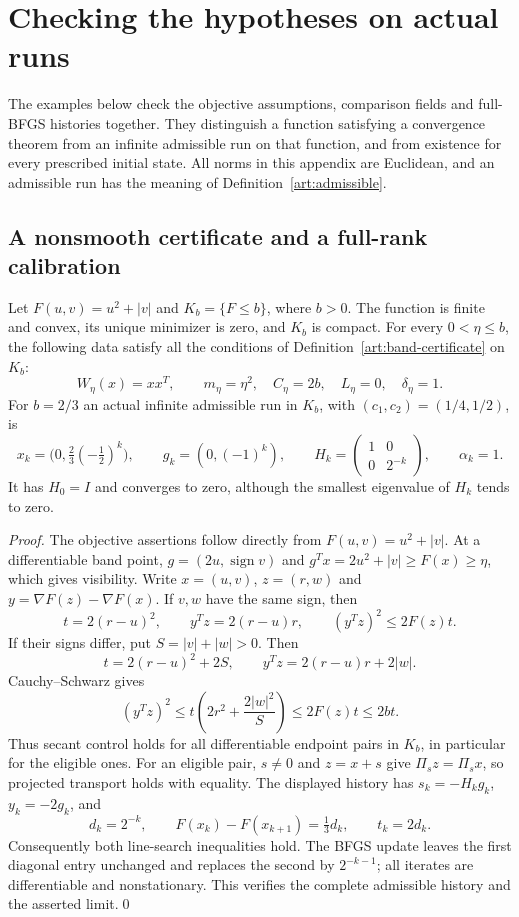 \section{Checking the hypotheses on actual runs}\label{art:hypothesis-examples}

The examples below check the objective assumptions, comparison fields and
full-BFGS histories together. They distinguish a function satisfying a
convergence theorem from an infinite admissible run on that function, and
from existence for every prescribed initial state. All norms in this appendix
are Euclidean, and an admissible run has the meaning of
Definition~\ref{art:admissible}.

\subsection{A nonsmooth certificate and a full-rank calibration}

\begin{proposition}\label{art:examples-mixed}
Let $F(u,v)=u^2+|v|$ and $K_b=\{F\le b\}$, where $b>0$.
The function is finite and convex, its unique minimizer is zero, and $K_b$
is compact. For every $0<\eta\le b$, the following data satisfy all the
conditions of Definition~\ref{art:band-certificate} on $K_b$:
\[
 W_\eta(x)=xx^T,\qquad m_\eta=\eta^2,\quad C_\eta=2b,
 \quad L_\eta=0,\quad\delta_\eta=1.
\]
For $b=2/3$ an actual infinite admissible run in $K_b$, with
$(c_1,c_2)=(1/4,1/2)$, is
\[
 x_k=\bigl(0,\tfrac23(-\tfrac12)^k\bigr),\qquad
 g_k=(0,(-1)^k),\qquad
 H_k=\begin{pmatrix}1&0\\0&2^{-k}\end{pmatrix},\qquad \alpha_k=1.
\]
It has $H_0=I$ and converges to zero, although the smallest eigenvalue of
$H_k$ tends to zero.
\end{proposition}
\begin{proof}
The objective assertions follow directly from $F(u,v)=u^2+|v|$.
At a differentiable band point, $g=(2u,\operatorname{sign}v)$ and
$g^Tx=2u^2+|v|\ge F(x)\ge\eta$, which gives visibility.
Write $x=(u,v)$, $z=(r,w)$ and $y=\nabla F(z)-\nabla F(x)$.
If $v,w$ have the same sign, then
\[
 t=2(r-u)^2,\qquad y^Tz=2(r-u)r,\qquad
 (y^Tz)^2\le 2F(z)t.
\]
If their signs differ, put $S=|v|+|w|>0$. Then
\[
 t=2(r-u)^2+2S,\qquad y^Tz=2(r-u)r+2|w|.
\]
Cauchy--Schwarz gives
\[
 (y^Tz)^2\le t\left(2r^2+\frac{2|w|^2}{S}\right)
             \le 2F(z)t\le2bt.
\]
Thus secant control holds for all differentiable endpoint pairs in $K_b$,
in particular for the eligible ones. For an eligible pair, $s\ne0$ and $z=x+s$
give $\Pi_s z=\Pi_s x$, so projected transport holds with equality.
The displayed history has $s_k=-H_kg_k$, $y_k=-2g_k$, and
\[
 d_k=2^{-k},\qquad F(x_k)-F(x_{k+1})=\tfrac13d_k,
 \qquad t_k=2d_k.
\]
Consequently both line-search inequalities hold. The BFGS update leaves
the first diagonal entry unchanged and replaces the second by $2^{-k-1}$;
all iterates are differentiable and nonstationary. This verifies the
complete admissible history and the asserted limit.\qed
\end{proof}

